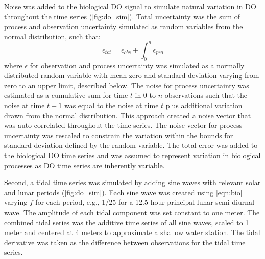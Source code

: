 \documentclass{article}\usepackage[]{graphicx}\usepackage[]{color}
\begin{document}
Noise was added to the biological DO signal to simulate natural variation in DO throughout the time series (\cref{fig:do_sim}).  Total uncertainty was the sum of process and observation uncertainty simulated as random variables from the normal distribution, such that:
\begin{equation}
\epsilon _{tot} = \epsilon _{obs} + \int_0^n \epsilon _{pro}
\end{equation}
where $\epsilon$ for observation and process uncertainty was simulated as a normally distributed random variable with mean zero and standard deviation varying from zero to an upper limit, described below.  The noise for process uncertainty was estimated as a cumulative sum for time $t$ in 0 to $n$ observations such that the noise at time $t+1$ was equal to the noise at time $t$ plus additional variation drawn from the normal distribution.  This approach created a noise vector that was auto-correlated throughout the time series.  The noise vector for process uncertainty was rescaled to constrain the variation within the bounds for standard deviation defined by the random variable. The total error was added to the biological DO time series and was assumed to represent variation in biological processes as DO time series are inherently variable. 

Second, a tidal time series was simulated by adding sine waves with relevant solar and lunar periods (\cref{fig:do_sim}).  Each sine wave was created using \cref{eqn:bio} varying $f$ for each period, e.g., 1/25 for a 12.5 hour principal lunar semi-diurnal wave.  The amplitude of each tidal component was set constant to one meter.  The combined tidal series was the additive time series of all sine waves, scaled to 1 meter and centered  at 4 meters to approximate a shallow water station.  The tidal derivative was taken as the difference between observations for the tidal time series. 
\end{document}

